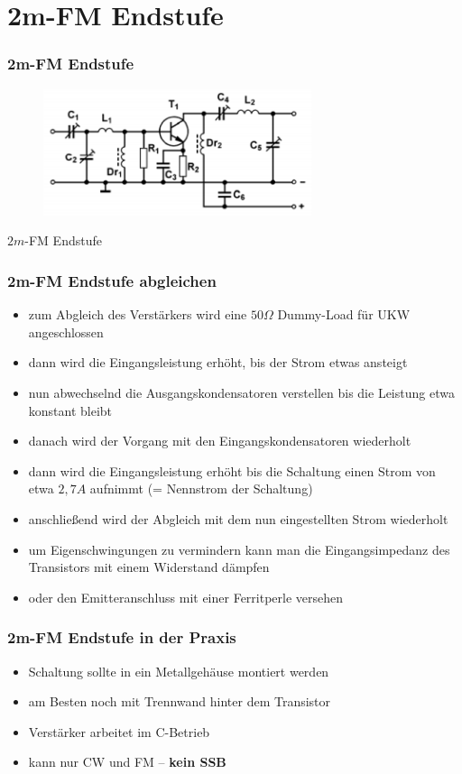 \section*{2m-FM Endstufe}
\begin{frame}
  \frametitle{2m-FM Endstufe}
  \begin{center}
    \begin{figure}
      \includegraphics[width=0.7\textwidth,height=.7\textheight,keepaspectratio]{a17/TG311.png}
    \end{figure}
    $2m$-FM Endstufe
  \end{center}
\end{frame}
\begin{frame}
  \frametitle{2m-FM Endstufe abgleichen}
  \begin{itemize}
    \item zum Abgleich des Verstärkers wird eine $50 \Omega$ Dummy-Load für UKW angeschlossen
    \item dann wird die Eingangsleistung erhöht, bis der Strom etwas ansteigt
    \item nun abwechselnd die Ausgangskondensatoren verstellen bis die Leistung etwa konstant bleibt
    \item danach wird der Vorgang mit den Eingangskondensatoren wiederholt
    \item dann wird die Eingangsleistung erhöht bis die Schaltung einen Strom von etwa $2,7 A$ aufnimmt (= Nennstrom der Schaltung)
    \item anschließend wird der Abgleich mit dem nun eingestellten Strom wiederholt
    \item um Eigenschwingungen zu vermindern kann man die Eingangsimpedanz des Transistors mit einem Widerstand dämpfen
    \item oder den Emitteranschluss mit einer Ferritperle versehen
  \end{itemize}
\end{frame}

\begin{frame}
  \frametitle{2m-FM Endstufe in der Praxis}
  \begin{itemize}
    \item Schaltung sollte in ein Metallgehäuse montiert werden
    \item am Besten noch mit Trennwand hinter dem Transistor
    \item Verstärker arbeitet im C-Betrieb
    \item kann nur CW und FM -- \textbf{kein SSB}
  \end{itemize}
\end{frame}

